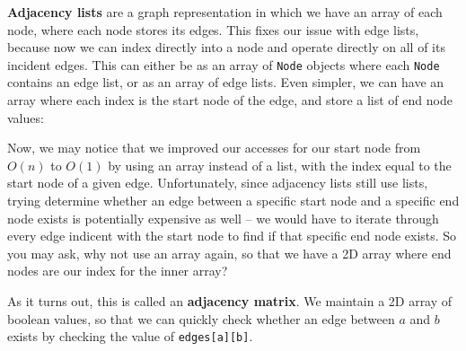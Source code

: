 \textbf{Adjacency lists}  are a graph representation in which we have an array of each node, where each node stores its edges. This fixes our issue with edge lists, because now we can index directly into a node and operate directly on all of its incident edges. This can either be as an array of \texttt{Node} objects where each \texttt{Node} contains an edge list, or as an array of edge lists. Even simpler, we can have an array where each index is the start node of the edge, and store a list of end node values:


Now, we may notice that we improved our accesses for our start node from $O(n)$ to $O(1)$ by using an array instead of a list, with the index equal to the start node of a given edge. Unfortunately, since adjacency lists still use lists, trying determine whether an edge between a specific start node and a specific end node exists is potentially expensive as well -- we would have to iterate through every edge indicent with the start node to find if that specific end node exists. So you may ask, why not use an array again, so that we have a 2D array where end nodes are our index for the inner array?

As it turns out, this is called an \textbf{adjacency matrix}. We maintain a 2D array of boolean values, so that we can quickly check whether an edge between $a$ and $b$ exists by checking the value of \texttt{edges[a][b]}.


